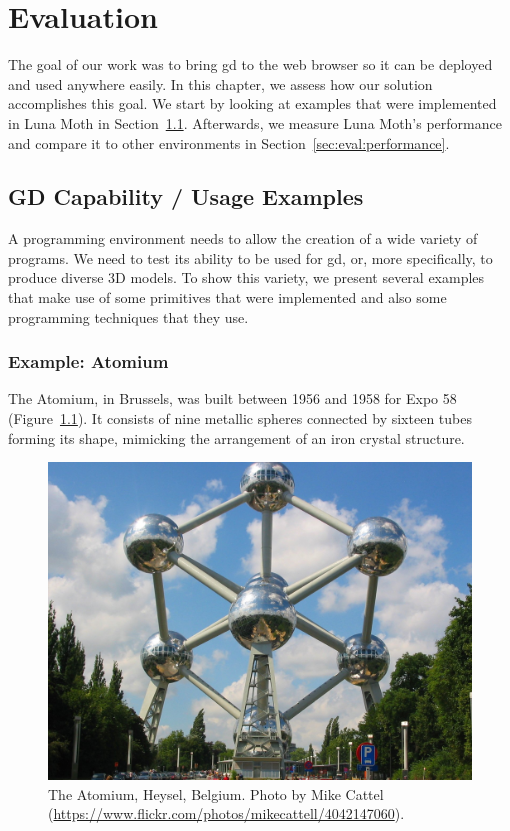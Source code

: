 
\chapter{Evaluation}
\label{chapter:evaluation}
The goal of our work was to bring \gls{gd} to the web browser so it can be deployed and used anywhere easily.
In this chapter, we assess how our solution accomplishes this goal.
We start by looking at examples that were implemented in Luna Moth in Section~\ref{sec:eval:gd:capable}.
Afterwards, we measure Luna Moth's performance and compare it to other environments in Section~\ref{sec:eval:performance}.


\section{GD Capability / Usage Examples}
\label{sec:eval:gd:capable}
A programming environment needs to allow the creation of a wide variety of programs.
We need to test its ability to be used for \gls{gd}, or, more specifically, to produce diverse 3D models.
To show this variety, we present several examples that make use of some primitives that were implemented and also some programming techniques that they use.


\subsection{Example: Atomium}
The Atomium, in Brussels, was built between 1956 and 1958 for Expo 58 (Figure~\ref{fig:atomium:photo}).
It consists of nine metallic spheres connected by sixteen tubes forming its shape, mimicking the arrangement of an iron crystal structure.

\begin{figure}
  \centering
  \includegraphics[width=0.6\linewidth]{./images/atomium_photo}
  \caption[The Atomium in Brussels.]{The Atomium, Heysel, Belgium. Photo by Mike Cattel (\url{https://www.flickr.com/photos/mikecattell/4042147060}).}
  \label{fig:atomium:photo}
\end{figure}

